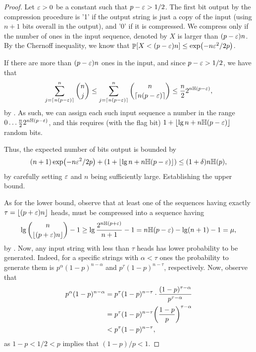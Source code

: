 \begin{proof}
    Let ${\varepsilon} > 0$ be a constant such that $p -{\varepsilon} > 1/2$. The first
    bit output by the compression procedure is '1' if the output
    string is just a copy of the input (using $n+1$ bits overall in
    the output), and '0' if it is compressed. We compress only if the
    number of ones in the input sequence, denoted by $X$ is larger than
    $(p-{\varepsilon})n$. By the Chernoff inequality, we know that 
    $\Prob{X < (p-\eps)n} \leq \exp \pth{-n \eps^2/2p}$.

    If there are more than $(p-{\varepsilon})n$ ones in the input, and since
    $p-{\varepsilon}>1/2$, we have that
    \begin{equation*}
    \sum_{j=\ceil{n (p-\eps)}}^{n} \binom{n}{j} \leq 
    \sum_{j=\ceil{n (p-\eps)}}^{n} \binom{n}{\ceil{n (p-\eps)}}
    \leq \frac{n}{2} 2^{n \Entropy{p-\eps}},
    \end{equation*}
    by . As such, we can assign each such
    input sequence a number in the range $0 \ldots \frac{n}{2} 2^{n
       \Entropy{p-\eps}}$, and this requires (with the flag bit) $1 +
    \floor{\lg n + n \Entropy{p-\eps}}$ random bits.
    
    Thus, the expected number of bits output is bounded by
    \begin{equation*}
    (n+1)\exp \pth{-n \eps^2/2p} + \pth{1 + \floor{\lg n + n
          \Entropy{p-\eps}}} \leq (1+\delta) n \Entropy{p},
    \end{equation*}
    by carefully setting ${\varepsilon}$ and $n$ being sufficiently
    large. Establishing the upper bound.

    As for the lower bound, observe that at least one of the sequences
    having exactly $\tau = \left\lfloor {(p + {\varepsilon})n} \right\rfloor$ heads, must be
    compressed into a sequence having
    \begin{equation*}
    \lg \binom{n}{\floor{(p+\eps)n}} - 1 \geq \lg
    \frac{2^{n\Entropy{p+\eps}}}{n+1} - 1 = n\Entropy{p-\eps} - \lg (n+1) -
    1 = \mu,
    \end{equation*}
    by . Now, any input string with less than
    $\tau$ heads has lower probability to be generated. Indeed, for a
    specific strings with $\alpha < \tau$ ones the probability to
    generate them is $p^\alpha (1-p)^{n-\alpha}$ and $p^\tau
    (1-p)^{n-\tau}$, respectively. Now, observe that
    \begin{align*}
        p^\alpha (1-p)^{n-\alpha}%
        &=%
        p^{\tau}(1-p)^{n-\tau}\cdot\frac{(1-p)^{\tau - \alpha}}{p^{\tau-\alpha}}
        \\&=%
        p^{\tau}(1-p)^{n-\tau} \pth{\frac{1-p}{p}}^{\tau-\alpha}
        \\&<%
        p^{\tau}(1-p)^{n-\tau},
    \end{align*}
    as $1-p < 1/2 < p$ implies that $(1-p)/p < 1$.


\end{proof}
